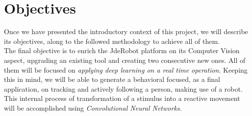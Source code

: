 \chapter{Objectives}
\label{chap:2_objectives}
Once we have presented the introductory context of this project, we will describe its objectives, along to the followed methodology to achieve all of them.\\

The final objective is to enrich the JdeRobot platform on its Computer Vision aspect, upgrading an existing tool and creating two consecutive new ones. All of them will be focused on \emph{applying deep learning on a real time operation}. Keeping this in mind, we will be able to generate a behavioral focused, as a final application, on tracking and actively following a person, making use of a robot. This internal process of transformation of a stimulus into a reactive movement will be accomplished using \textit{Convolutional Neural Networks}.\\


